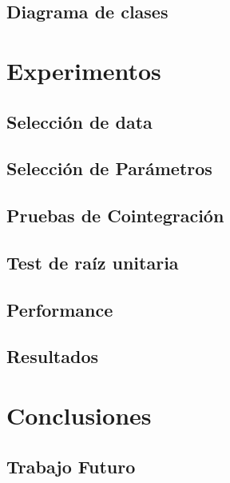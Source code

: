 \documentclass{beamer}
\begin{document}
        \subsection{Diagrama de clases}
    \section{Experimentos}
        \subsection{Selección de data}
        \subsection{Selección de Parámetros}
        \subsection{Pruebas de Cointegración}
        \subsection{Test de raíz unitaria}
        \subsection{Performance}
        \subsection{Resultados}
    \section{Conclusiones}
        \subsection{Trabajo Futuro}
	
\end{document}
